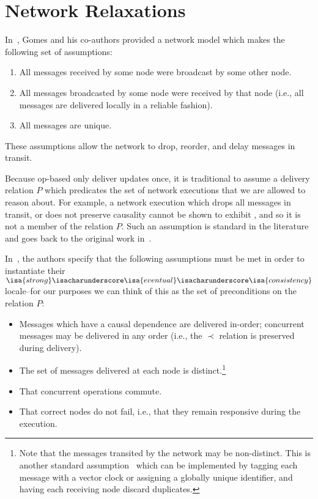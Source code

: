 \section{Network Relaxations}
\label{sec:network-relaxations}
In~\citep{gomes17}, Gomes and his co-authors provided a network model which
makes the following set of assumptions:
\begin{enumerate}
  \item All messages received by some node were broadcast by some other node.
  \item All messages broadcasted by some node were received by that node (i.e.,
    all messages are delivered locally in a reliable fashion).
  \item All messages are unique.
\end{enumerate}
These assumptions allow the network to drop, reorder, and delay messages in
transit.

Because op-based \CRDTs only deliver updates once, it is traditional to assume a
delivery relation $P$ which predicates the set of network executions that we are
allowed to reason about. For example, a network execution which drops all
messages in transit, or does not preserve causality cannot be shown to exhibit
\SEC, and so it is not a member of the relation $P$.  Such an assumption is
standard in the literature and goes back to the original work
in~\citep{shapiro11}.

In~\citep{gomes17}, the authors specify that the following assumptions must be
met in order to instantiate their
$\isa{strong}\isacharunderscore\isa{eventual}\isacharunderscore\isa{consistency}$
locale--for our purposes we can think of this as the set of preconditions on the
relation $P$:
\begin{itemize}
  \item Messages which have a causal dependence are delivered in-order;
    concurrent messages may be delivered in any order (i.e., the $\prec$
    relation is preserved during delivery).
  \item The set of messages delivered at each node is distinct.\footnote{Note
    that the messages transited by the network may be non-distinct. This is
    another standard assumption~\citep{} which can be implemented by tagging
    each message with a vector clock or assigning a globally unique identifier,
    and having each receiving node discard duplicates.}
  \item That concurrent operations commute.
  \item That correct nodes do not fail, i.e., that they remain responsive during
    the execution.
\end{itemize}

